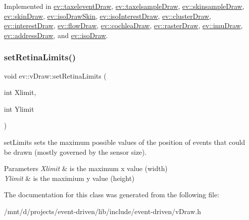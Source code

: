 Implemented in \hyperlink{classev_1_1taxeleventDraw_a474b409ea48a97749caaf172f5fd467a}{ev\+::taxelevent\+Draw}, \hyperlink{classev_1_1taxelsampleDraw_a7bf19e7de1e4851b5567308e95334942}{ev\+::taxelsample\+Draw}, \hyperlink{classev_1_1skinsampleDraw_a32064d959f2c127d25a9fa6773384850}{ev\+::skinsample\+Draw}, \hyperlink{classev_1_1skinDraw_a7015a083dffe5c055808c20b9372bce4}{ev\+::skin\+Draw}, \hyperlink{classev_1_1isoDrawSkin_a9f1bce77ba050a37dfe151e2246779bc}{ev\+::iso\+Draw\+Skin}, \hyperlink{classev_1_1isoInterestDraw_a93b2142d5652f725e21d34fedde103df}{ev\+::iso\+Interest\+Draw}, \hyperlink{classev_1_1clusterDraw_a21cd4ba2277ad5258b39d135e445b32f}{ev\+::cluster\+Draw}, \hyperlink{classev_1_1interestDraw_a97dbea009b993f0d8f4b6967b2b241ad}{ev\+::interest\+Draw}, \hyperlink{classev_1_1flowDraw_a6caf6d848d79407e62b7bf13c58d583e}{ev\+::flow\+Draw}, \hyperlink{classev_1_1cochleaDraw_a722aac2b6c1af1f6691721beb8a25325}{ev\+::cochlea\+Draw}, \hyperlink{classev_1_1rasterDraw_a687569e3beafa6aa9e73e3eeaad64d59}{ev\+::raster\+Draw}, \hyperlink{classev_1_1imuDraw_ab622b53cbe53421958cb7572919a0318}{ev\+::imu\+Draw}, \hyperlink{classev_1_1addressDraw_a92e98d08d1fdbf47d7e0cb9fcf7a9937}{ev\+::address\+Draw}, and \hyperlink{classev_1_1isoDraw_abd32cc393e5489ee97b5a8b94e6dd88d}{ev\+::iso\+Draw}.

\mbox{\label{classev_1_1vDraw_a0362710d8ca805d19b013818660bc867}} 
\subsubsection{\texorpdfstring{set\+Retina\+Limits()}{setRetinaLimits()}}
{\footnotesize\ttfamily void ev\+::v\+Draw\+::set\+Retina\+Limits (\begin{DoxyParamCaption}\item[{int}]{Xlimit,  }\item[{int}]{Ylimit }\end{DoxyParamCaption})\hspace{0.3cm}{\ttfamily [inline]}}



set\+Limits sets the maximum possible values of the position of events that could be drawn (mostly governed by the sensor size). 


\begin{DoxyParams}{Parameters}
{\em Xlimit} & is the maximum x value (width) \\
\hline
{\em Ylimit} & is the maximium y value (height) \\
\hline
\end{DoxyParams}


The documentation for this class was generated from the following file\+:\begin{DoxyCompactItemize}
\item 
/mnt/d/projects/event-\/driven/lib/include/event-\/driven/v\+Draw.\+h\end{DoxyCompactItemize}
